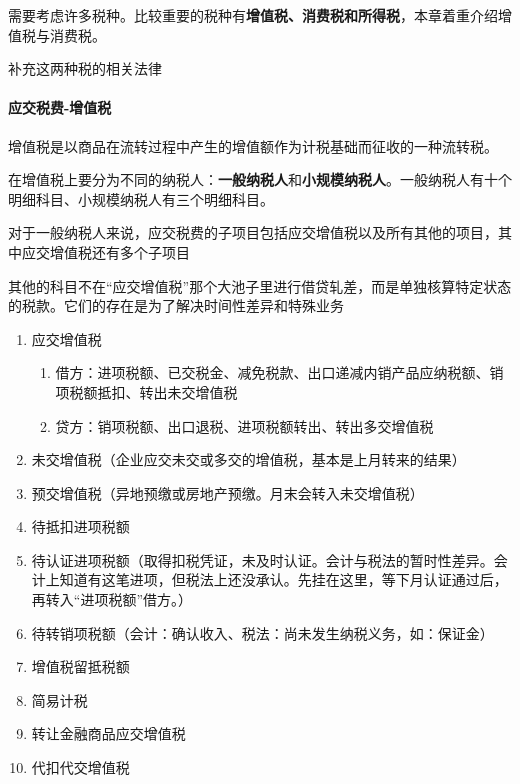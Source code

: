 \documentclass[UTF8,12pt]{ctexart}
\numberwithin{equation}{section} %
\numberwithin{figure}{section}
\numberwithin{table}{section}
\begin{document}
	需要考虑许多税种。比较重要的税种有\textbf{增值税、消费税和所得税}，本章着重介绍增值税与消费税。
	
	补充这两种税的相关法律
	
	\paragraph{应交税费-增值税}
	
	增值税是以商品在流转过程中产生的增值额作为计税基础而征收的一种流转税。
	
	在增值税上要分为不同的纳税人：\textbf{一般纳税人}和\textbf{小规模纳税人}。一般纳税人有十个明细科目、小规模纳税人有三个明细科目。
	
	对于一般纳税人来说，应交税费的子项目包括应交增值税以及所有其他的项目，其中应交增值税还有多个子项目
	
	其他的科目不在“应交增值税”那个大池子里进行借贷轧差，而是单独核算特定状态的税款。它们的存在是为了解决时间性差异和特殊业务
	\begin{enumerate}
		\item 应交增值税
		\begin{enumerate}
			\item 借方：进项税额、已交税金、减免税款、出口递减内销产品应纳税额、销项税额抵扣、转出未交增值税
			
			\item 贷方：销项税额、出口退税、进项税额转出、转出多交增值税
		\end{enumerate}
		
		\item 未交增值税（企业应交未交或多交的增值税，基本是上月转来的结果）
		
		\item 预交增值税（异地预缴或房地产预缴。月末会转入未交增值税）
		
		\item 待抵扣进项税额
		
		\item 待认证进项税额（取得扣税凭证，未及时认证。会计与税法的暂时性差异。会计上知道有这笔进项，但税法上还没承认。先挂在这里，等下月认证通过后，再转入“进项税额”借方。）
		
		\item 待转销项税额（会计：确认收入、税法：尚未发生纳税义务，如：保证金）
		
		\item 增值税留抵税额
		
		\item 简易计税
		
		\item 转让金融商品应交增值税
		
		\item 代扣代交增值税
	\end{enumerate}
	
\end{document}
